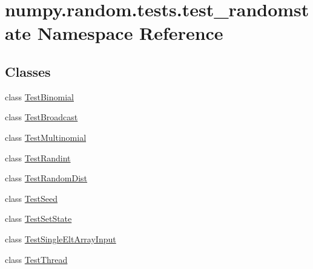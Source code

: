 \hypertarget{namespacenumpy_1_1random_1_1tests_1_1test__randomstate}{}\section{numpy.\+random.\+tests.\+test\+\_\+randomstate Namespace Reference}
\label{namespacenumpy_1_1random_1_1tests_1_1test__randomstate}
\subsection*{Classes}
\begin{DoxyCompactItemize}
\item 
class \hyperlink{classnumpy_1_1random_1_1tests_1_1test__randomstate_1_1TestBinomial}{Test\+Binomial}
\item 
class \hyperlink{classnumpy_1_1random_1_1tests_1_1test__randomstate_1_1TestBroadcast}{Test\+Broadcast}
\item 
class \hyperlink{classnumpy_1_1random_1_1tests_1_1test__randomstate_1_1TestMultinomial}{Test\+Multinomial}
\item 
class \hyperlink{classnumpy_1_1random_1_1tests_1_1test__randomstate_1_1TestRandint}{Test\+Randint}
\item 
class \hyperlink{classnumpy_1_1random_1_1tests_1_1test__randomstate_1_1TestRandomDist}{Test\+Random\+Dist}
\item 
class \hyperlink{classnumpy_1_1random_1_1tests_1_1test__randomstate_1_1TestSeed}{Test\+Seed}
\item 
class \hyperlink{classnumpy_1_1random_1_1tests_1_1test__randomstate_1_1TestSetState}{Test\+Set\+State}
\item 
class \hyperlink{classnumpy_1_1random_1_1tests_1_1test__randomstate_1_1TestSingleEltArrayInput}{Test\+Single\+Elt\+Array\+Input}
\item 
class \hyperlink{classnumpy_1_1random_1_1tests_1_1test__randomstate_1_1TestThread}{Test\+Thread}
\end{DoxyCompactItemize}
